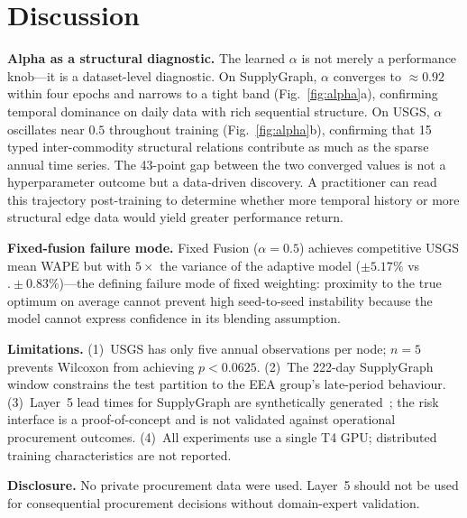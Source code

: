 
\section{Discussion}
\label{sec:discussion}

\textbf{Alpha as a structural diagnostic.}
The learned $\alpha$ is not merely a performance knob---it is a
dataset-level diagnostic. On SupplyGraph, $\alpha$ converges to
${\approx}0.92$ within four epochs and narrows to a tight band
(Fig.~\ref{fig:alpha}a), confirming temporal dominance on daily
data with rich sequential structure. On USGS, $\alpha$ oscillates
near $0.5$ throughout training (Fig.~\ref{fig:alpha}b), confirming
that 15 typed inter-commodity structural relations contribute as
much as the sparse annual time series. The 43-point gap between
the two converged values is not a hyperparameter outcome but a
data-driven discovery. A practitioner can read this trajectory
post-training to determine whether more temporal history or more
structural edge data would yield greater performance return.

\textbf{Fixed-fusion failure mode.}
Fixed Fusion ($\alpha{=}0.5$) achieves competitive USGS mean WAPE
but with $5\times$ the variance of the adaptive model
(${\pm}5.17\%$ vs $.{\pm}0.83\%$)---the defining failure mode of
fixed weighting: proximity to the true optimum on average cannot
prevent high seed-to-seed instability because the model cannot
express confidence in its blending assumption.

\textbf{Limitations.}
(1)~USGS has only five annual observations per node; $n{=}5$
prevents Wilcoxon from achieving $p{<}0.0625$.
(2)~The 222-day SupplyGraph window constrains the test partition
to the EEA group's late-period behaviour.
(3)~Layer~5 lead times for SupplyGraph are synthetically
generated~\cite{chopra2007supply}; the risk interface is a
proof-of-concept and is not validated against operational
procurement outcomes.
(4)~All experiments use a single T4 GPU; distributed training
characteristics are not reported.

\smallskip
\noindent\textbf{Disclosure.} No private procurement data were
used. Layer~5 should not be used for consequential procurement
decisions without domain-expert validation.
